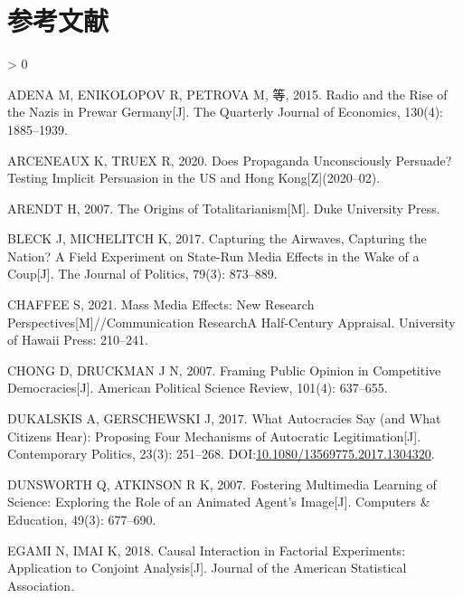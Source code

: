\documentclass[
  12pt,
]{ctexart}
\newlength{\cslhangindent}
\newenvironment{CSLReferences}[2] %
 {%
  \setlength{\parindent}{0pt}
  \ifodd #1 \everypar{\setlength{\hangindent}{\cslhangindent}}\ignorespaces\fi
  \ifnum #2 > 0
  \setlength{\parskip}{#2\baselineskip}
  \fi
 }%
 {}
\begin{document}
\newpage

\hypertarget{ux53c2ux8003ux6587ux732e}{%
\section*{参考文献}\label{ux53c2ux8003ux6587ux732e}}

\hypertarget{refs}{}
\begin{CSLReferences}{1}{0}
\leavevmode\hypertarget{ref-AdenaEtAl2015}{}%
ADENA M, ENIKOLOPOV R, PETROVA M, 等, 2015. Radio and the {Rise} of the {Nazis} in {Prewar Germany}{[}J{]}. The Quarterly Journal of Economics, 130(4): 1885--1939.

\leavevmode\hypertarget{ref-ArceneauxTruex2020}{}%
ARCENEAUX K, TRUEX R, 2020. Does {Propaganda Unconsciously Persuade}? {Testing Implicit Persuasion} in the {US} and {Hong Kong}{[}Z{]}(2020--02).

\leavevmode\hypertarget{ref-Arendt2007}{}%
ARENDT H, 2007. The Origins of Totalitarianism{[}M{]}. {Duke University Press}.

\leavevmode\hypertarget{ref-BleckMichelitch2017}{}%
BLECK J, MICHELITCH K, 2017. Capturing the Airwaves, Capturing the Nation? {A} Field Experiment on State-Run Media Effects in the Wake of a Coup{[}J{]}. The Journal of Politics, 79(3): 873--889.

\leavevmode\hypertarget{ref-Chaffee2021}{}%
CHAFFEE S, 2021. Mass Media Effects: {New} Research Perspectives{[}M{]}//Communication Research{{A}} Half-Century Appraisal. {University of Hawaii Press}: 210--241.

\leavevmode\hypertarget{ref-ChongDruckman2007}{}%
CHONG D, DRUCKMAN J N, 2007. Framing Public Opinion in Competitive Democracies{[}J{]}. American Political Science Review, 101(4): 637--655.

\leavevmode\hypertarget{ref-DukalskisGerschewski2017}{}%
DUKALSKIS A, GERSCHEWSKI J, 2017. What Autocracies Say (and What Citizens Hear): Proposing Four Mechanisms of Autocratic Legitimation{[}J{]}. Contemporary Politics, 23(3): 251--268. DOI:\href{https://doi.org/10.1080/13569775.2017.1304320}{10.1080/13569775.2017.1304320}.

\leavevmode\hypertarget{ref-DunsworthAtkinson2007}{}%
DUNSWORTH Q, ATKINSON R K, 2007. Fostering Multimedia Learning of Science: {Exploring} the Role of an Animated Agent's Image{[}J{]}. Computers \& Education, 49(3): 677--690.

\leavevmode\hypertarget{ref-EgamiImai2018}{}%
EGAMI N, IMAI K, 2018. Causal Interaction in Factorial Experiments: {Application} to Conjoint Analysis{[}J{]}. Journal of the American Statistical Association.


\end{CSLReferences}
\end{document}
